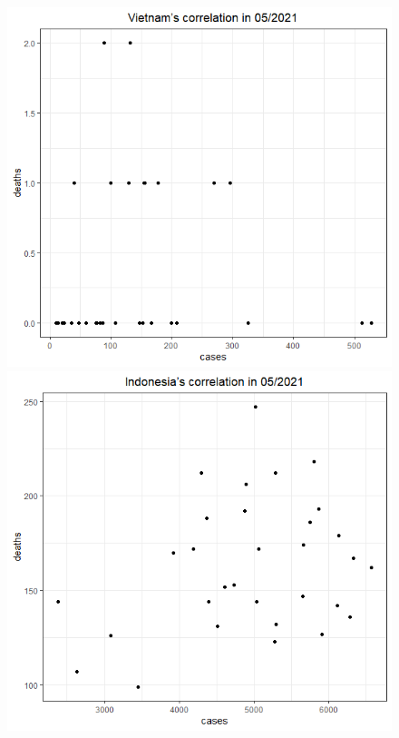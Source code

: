 \documentclass[a4paper]{article}
\theoremstyle{definition}
\begin{document}
\begin{enumerate}[1)]
\begin{figure}[H]
\begin{center}
        \includegraphics[scale = 0.3]{ix/ix.2/VN_05_2021.png}
        \includegraphics[scale = 0.3]{ix/ix.2/IDN_05_2021.png}

\end{center}
\end{figure}
\end{enumerate}
\end{document}

